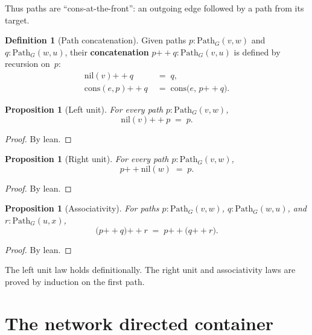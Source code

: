 \documentclass[11pt,a4paper]{article}
\theoremstyle{plain}
\newtheorem{proposition}[theorem]{Proposition}
\theoremstyle{definition}
\newtheorem{definition}[theorem]{Definition}
\begin{document}
Thus paths are ``cons-at-the-front'': an outgoing edge followed by a path from
its target.

\begin{definition}[Path concatenation]\label{def:append}
Given paths $p : \mathrm{Path}_G(v,w)$ and $q : \mathrm{Path}_G(w,u)$, their
\textbf{concatenation} $p \mathbin{{+}{+}} q : \mathrm{Path}_G(v,u)$ is defined
by recursion on~$p$:
\begin{align}
  \mathrm{nil}(v) \mathbin{{+}{+}} q &\;=\; q, \\
  \mathrm{cons}(e,p) \mathbin{{+}{+}} q &\;=\; \mathrm{cons}\bigl(e,\, p \mathbin{{+}{+}} q\bigr).
\end{align}
\end{definition}

\begin{proposition}[Left unit]\label{prop:nil-append}
For every path $p : \mathrm{Path}_G(v,w)$,
\[
  \mathrm{nil}(v) \mathbin{{+}{+}} p \;=\; p.
\]
\end{proposition}

\begin{proof}
By lean.
\end{proof}

\begin{proposition}[Right unit]\label{prop:append-nil}
For every path $p : \mathrm{Path}_G(v,w)$,
\[
  p \mathbin{{+}{+}} \mathrm{nil}(w) \;=\; p.
\]
\end{proposition}

\begin{proof}
By lean.
\end{proof}

\begin{proposition}[Associativity]\label{prop:append-assoc}
For paths $p : \mathrm{Path}_G(v,w)$, $q : \mathrm{Path}_G(w,u)$, and
$r : \mathrm{Path}_G(u,x)$,
\[
  \bigl(p \mathbin{{+}{+}} q\bigr) \mathbin{{+}{+}} r
  \;=\;
  p \mathbin{{+}{+}} \bigl(q \mathbin{{+}{+}} r\bigr).
\]
\end{proposition}

\begin{proof}
By lean.
\end{proof}

The left unit law holds definitionally. The right unit and associativity laws
are proved by induction on the first path.

\section{The network directed container}
\end{document}
